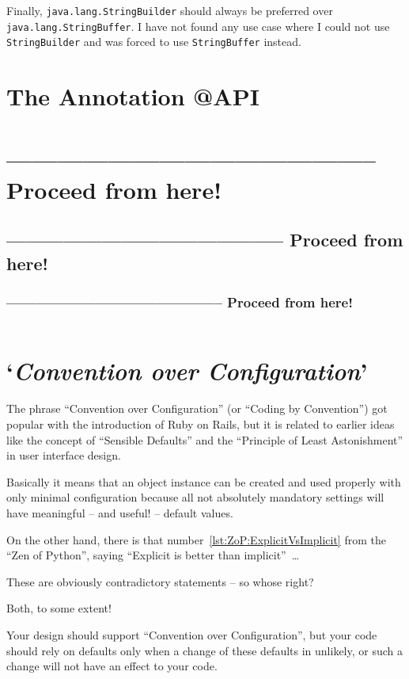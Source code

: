 \documentclass[11pt,a4paper, titlepage, parskip=half, headsepline, footsepline, cleardoublepage=current, headheight=1cm]{scrbook}
\begin{document}
Finally, \lstinline|java.lang.StringBuilder| should always be preferred over \lstinline|java.lang.StringBuffer|. I have not found any use case where I could not use \lstinline|StringBuilder| and was forced to use \lstinline|StringBuffer| instead.

\section{The Annotation @API}\label{sec:APIAnnotation}
\section{-------------------------------------------- Proceed from here!}
\subsection{-------------------------------------------- Proceed from here!}
\subsubsection{-------------------------------------------- Proceed from here!}
\autocite{APIGUARDIAN}
\autocite{APIGUARDIAN:API}
\lipsum[1]

\begin{lstlisting}
\end{lstlisting}

\section{‘\textit{Convention over Configuration}’}
The phrase “Convention over Configuration” (or “Coding by Convention”) got popular with the introduction of Ruby on Rails, but it is related to earlier ideas like the concept of “Sensible Defaults” and the “Principle of Least Astonishment” in user interface design.

Basically it means that an object instance can be created and used properly with only minimal configuration because all not absolutely mandatory settings will have meaningful – and useful! – default values.

On the other hand, there is that number~\ref{lst:ZoP:ExplicitVsImplicit} from the “Zen of Python”, saying “Explicit is better than implicit”~…

These are obviously contradictory statements – so whose right?

Both, to some extent!

Your design should support “Convention over Configuration”, but your code should rely on defaults only when a change of these defaults in unlikely, or such a change will not have an effect to your code.
\end{document}
